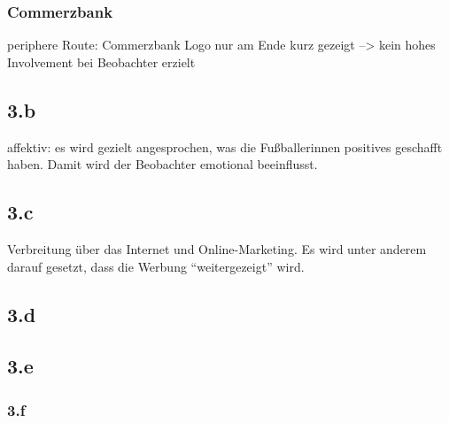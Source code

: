 \documentclass{article}
\begin{document}
\subsubsection{Commerzbank}
periphere Route: Commerzbank Logo nur am Ende kurz gezeigt --> kein hohes Involvement bei Beobachter erzielt

\subsection{3.b}
affektiv: es wird gezielt angesprochen, was die Fußballerinnen positives geschafft haben. Damit wird der Beobachter emotional beeinflusst.

\subsection{3.c}
Verbreitung über das Internet und Online-Marketing. Es wird unter anderem darauf gesetzt, dass die Werbung "`weitergezeigt"' wird.

\subsection{3.d}


\subsection{3.e}


\subsubsection{3.f}
\end{document}

